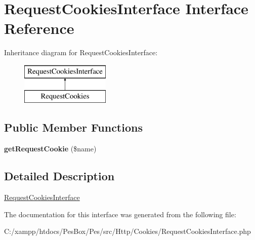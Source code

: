 \hypertarget{interface_pes_1_1_http_1_1_cookies_1_1_request_cookies_interface}{}\section{Request\+Cookies\+Interface Interface Reference}
\label{interface_pes_1_1_http_1_1_cookies_1_1_request_cookies_interface}
Inheritance diagram for Request\+Cookies\+Interface\+:\begin{figure}[H]
\begin{center}
\leavevmode
\includegraphics[height=2.000000cm]{interface_pes_1_1_http_1_1_cookies_1_1_request_cookies_interface}
\end{center}
\end{figure}
\subsection*{Public Member Functions}
\begin{DoxyCompactItemize}
\item 
\mbox{\label{interface_pes_1_1_http_1_1_cookies_1_1_request_cookies_interface_ae729ed33564f742b4a057d3caded9677}} 
{\bfseries get\+Request\+Cookie} (\$name)
\end{DoxyCompactItemize}


\subsection{Detailed Description}
\mbox{\hyperlink{interface_pes_1_1_http_1_1_cookies_1_1_request_cookies_interface}{Request\+Cookies\+Interface}} 

The documentation for this interface was generated from the following file\+:\begin{DoxyCompactItemize}
\item 
C\+:/xampp/htdocs/\+Pes\+Box/\+Pes/src/\+Http/\+Cookies/Request\+Cookies\+Interface.\+php\end{DoxyCompactItemize}
